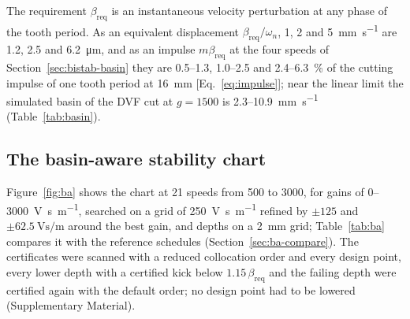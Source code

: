 The requirement $\beta_{\mathrm{req}}$ is an instantaneous velocity perturbation at any phase of the tooth period. As an equivalent displacement $\beta_{\mathrm{req}}/\omega_n$, 1, 2 and \SI{5}{\milli\metre\per\second} are 1.2, 2.5 and \SI{6.2}{\micro\metre}, and as an impulse $m\beta_{\mathrm{req}}$ at the four speeds of Section~\ref{sec:bistab-basin} they are 0.5--1.3, 1.0--2.5 and 2.4--\SI{6.3}{\percent} of the cutting impulse of one tooth period at \SI{16}{\milli\metre} [Eq.~\eqref{eq:impulse}]; near the linear limit the simulated basin of the DVF cut at $g=1500$ is 2.3--\SI{10.9}{\milli\metre\per\second} (Table~\ref{tab:basin}).

\subsection{The basin-aware stability chart}\label{sec:ba-res}

Figure~\ref{fig:ba} shows the chart at 21 speeds from 500 to \SI{3000}{\rpm}, for gains of 0--\SI{3000}{\volt\second\per\metre}, searched on a grid of \SI{250}{\volt\second\per\metre} refined by $\pm125$ and $\pm\SI{62.5}{\volt\second\per\metre}$ around the best gain, and depths on a \SI{2}{\milli\metre} grid; Table~\ref{tab:ba} compares it with the reference schedules (Section~\ref{sec:ba-compare}). The certificates were scanned with a reduced collocation order and every design point, every lower depth with a certified kick below $1.15\,\beta_{\mathrm{req}}$ and the failing depth were certified again with the default order; no design point had to be lowered (Supplementary Material).

